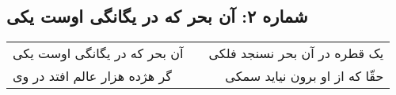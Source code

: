 \begin{center}
\section*{شماره ۲: آن بحر که در یگانگی اوست یکی}
\label{sec:002}
\begin{longtable}{l p{0.5cm} r}
آن بحر که در یگانگی اوست یکی
&&
یک قطره در آن بحر نسنجد فلکی
\\
گر هژده هزار عالم افتد در وی
&&
حقّا که از او برون نیاید سمکی
\\
\end{longtable}
\end{center}
